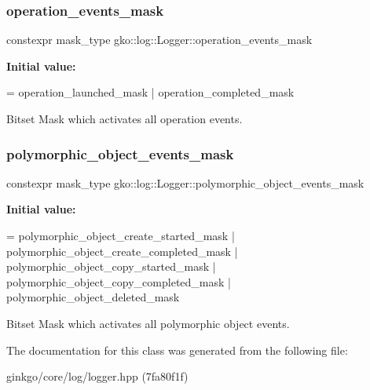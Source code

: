 \mbox{\label{classgko_1_1log_1_1Logger_a179f3d3ac86782922cbc63e33272840a}} 
\subsubsection{\texorpdfstring{operation\+\_\+events\+\_\+mask}{operation\_events\_mask}}
{\footnotesize\ttfamily constexpr mask\+\_\+type gko\+::log\+::\+Logger\+::operation\+\_\+events\+\_\+mask\hspace{0.3cm}{\ttfamily [static]}}

{\bfseries Initial value\+:}
\begin{DoxyCode}
=
        operation\_launched\_mask | operation\_completed\_mask
\end{DoxyCode}


Bitset Mask which activates all operation events. 

\mbox{\label{classgko_1_1log_1_1Logger_a5fb997f1c06c0602103d8dab616a96bc}} 
\subsubsection{\texorpdfstring{polymorphic\+\_\+object\+\_\+events\+\_\+mask}{polymorphic\_object\_events\_mask}}
{\footnotesize\ttfamily constexpr mask\+\_\+type gko\+::log\+::\+Logger\+::polymorphic\+\_\+object\+\_\+events\+\_\+mask\hspace{0.3cm}{\ttfamily [static]}}

{\bfseries Initial value\+:}
\begin{DoxyCode}
=
        polymorphic\_object\_create\_started\_mask |
        polymorphic\_object\_create\_completed\_mask |
        polymorphic\_object\_copy\_started\_mask |
        polymorphic\_object\_copy\_completed\_mask |
        polymorphic\_object\_deleted\_mask
\end{DoxyCode}


Bitset Mask which activates all polymorphic object events. 



The documentation for this class was generated from the following file\+:\begin{DoxyCompactItemize}
\item 
ginkgo/core/log/logger.\+hpp (7fa80f1f)\end{DoxyCompactItemize}
